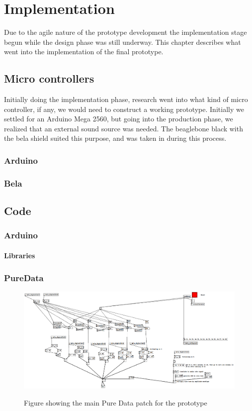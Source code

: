 \chapter{Implementation}%
Due to the agile nature of the prototype development the implementation stage begun while the design phase was still underway. This chapter describes what went into the implementation of the final prototype.

\section{Micro controllers}%
	Initially doing the implementation phase, research went into what kind of micro controller, if any, we would need to construct a working prototype. Initially we settled for an Arduino Mega 2560, but going into the production phase, we realized that an external sound source was needed. The beaglebone black with the bela shield suited this purpose, and was taken in during this process.
	\subsection{Arduino}%
		
		
	\subsection{Bela}%
		
	
\section{Code}
	\subsection{Arduino}%
		\subsubsection{Libraries}%
	\subsection{PureData}%
	\begin{figure}[H]
		\centering
		\includegraphics[width=1\linewidth]{figure/Implementation/pdPatch}
		\label{fig:pdPatch}
		\caption{Figure showing the main Pure Data patch for the prototype}
	\end{figure}	
	
